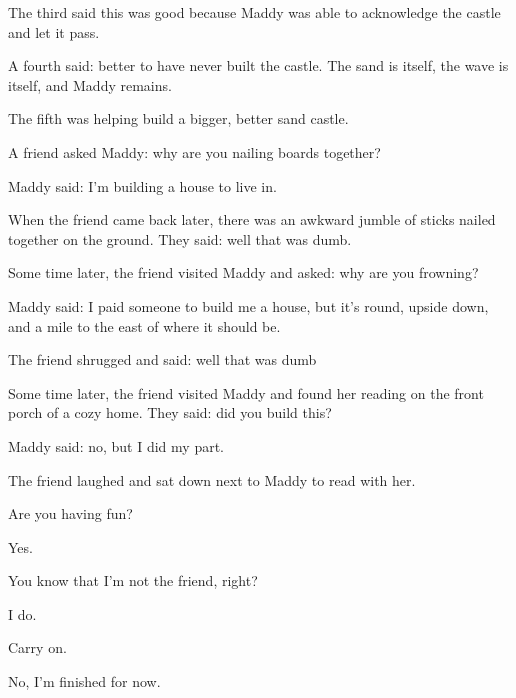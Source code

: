 The third said this was good because Maddy was able to acknowledge the castle and let it pass.

A fourth said: better to have never built the castle. The sand is itself, the wave is itself, and Maddy remains.

The fifth was helping build a bigger, better sand castle.
\newpage

\noindent A friend asked Maddy: why are you nailing boards together?

Maddy said: I'm building a house to live in.

When the friend came back later, there was an awkward jumble of sticks nailed together on the ground. They said: well that was dumb.

Some time later, the friend visited Maddy and asked: why are you frowning?

Maddy said: I paid someone to build me a house, but it's round, upside down, and a mile to the east of where it should be.

The friend shrugged and said: well that was dumb

Some time later, the friend visited Maddy and found her reading on the front porch of a cozy home. They said: did you build this?

Maddy said: no, but I did my part.

The friend laughed and sat down next to Maddy to read with her.
\newpage

\begin{ally}
Are you having fun?
\end{ally}
Yes.

\begin{ally}
You know that I'm not the friend, right?
\end{ally}
I do.

\begin{ally}
Carry on.
\end{ally}
No, I'm finished for now.
\newpage
